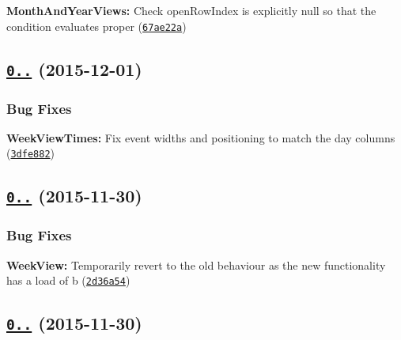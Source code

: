 \begin{DoxyItemize}
\item {\bfseries Month\+And\+Year\+Views\+:} Check open\+Row\+Index is explicitly null so that the condition evaluates proper (\href{https://github.com/mattlewis92/angular-bootstrap-calendar/commit/67ae22a}{\tt 67ae22a})
\end{DoxyItemize}

\label{_0.17.5}%
 \subsection*{\href{https://github.com/mattlewis92/angular-bootstrap-calendar/compare/0.17.4...v0.17.5}{\tt 0..} (2015-\/12-\/01)}

\subsubsection*{Bug Fixes}


\begin{DoxyItemize}
\item {\bfseries Week\+View\+Times\+:} Fix event widths and positioning to match the day columns (\href{https://github.com/mattlewis92/angular-bootstrap-calendar/commit/3dfe882}{\tt 3dfe882})
\end{DoxyItemize}

\label{_0.17.4}%
 \subsection*{\href{https://github.com/mattlewis92/angular-bootstrap-calendar/compare/0.17.3...v0.17.4}{\tt 0..} (2015-\/11-\/30)}

\subsubsection*{Bug Fixes}


\begin{DoxyItemize}
\item {\bfseries Week\+View\+:} Temporarily revert to the old behaviour as the new functionality has a load of b (\href{https://github.com/mattlewis92/angular-bootstrap-calendar/commit/2d36a54}{\tt 2d36a54})
\end{DoxyItemize}

\label{_0.17.3}%
 \subsection*{\href{https://github.com/mattlewis92/angular-bootstrap-calendar/compare/0.17.2...v0.17.3}{\tt 0..} (2015-\/11-\/30)}

